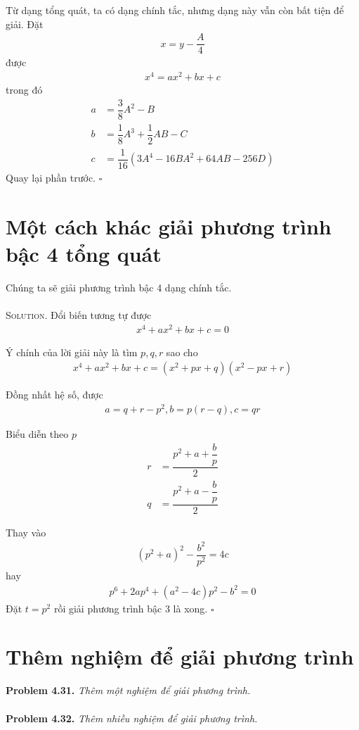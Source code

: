 \documentclass[a4paper,oneside]{book}
\numberwithin{equation}{chapter}
\begin{document}
Từ dạng tổng quát, ta có dạng chính tắc, nhưng dạng này vẫn còn bất tiện để giải. Đặt 
\begin{align}
x = y - \dfrac{A}{4}
\end{align}
được
\begin{align}
{x^4} = a{x^2} + bx + c
\end{align}
trong đó
\begin{align}
a &= \dfrac{3}{8}{A^2} - B\\
b &= \dfrac{1}{8}{A^3} + \dfrac{1}{2}AB - C\\
c &= \dfrac{1}{{16}}\left( {3{A^4} - 16B{A^2} + 64AB - 256D} \right)
\end{align}
Quay lại phần trước. \hfill $\square$
\section{Một cách khác giải phương trình bậc 4 tổng quát}
Chúng ta sẽ giải phương trình bậc 4 dạng chính tắc.\\
\\
\textsc{Solution.} Đổi biến tương tự được
\begin{align}
{x^4} + a{x^2} + bx + c = 0
\end{align}

Ý chính của lời giải này là tìm $p,q,r$ sao cho
\begin{align}
{x^4} + a{x^2} + bx + c = \left( {{x^2} + px + q} \right)\left( {{x^2} - px + r} \right)
\end{align}

Đồng nhất hệ số, được \begin{align}
a = q + r - {p^2},b = p\left( {r - q} \right),c = qr
\end{align}

Biểu diễn theo $p$
\begin{align}
r &= \dfrac{{{p^2} + a + \dfrac{b}{p}}}{2}\\
q &= \dfrac{{{p^2} + a - \dfrac{b}{p}}}{2}
\end{align}

Thay vào
\begin{align}
{\left( {{p^2} + a} \right)^2} - \dfrac{{{b^2}}}{{{p^2}}} = 4c
\end{align}
hay
\begin{align}
{p^6} + 2a{p^4} + \left( {{a^2} - 4c} \right){p^2} - {b^2} = 0
\end{align}
Đặt $t = {p^2}$ rồi giải phương trình bậc 3 là xong. \hfill $\square$
\section{Thêm nghiệm để giải phương trình}
\textbf{Problem 4.31.} \textit{Thêm một nghiệm để giải phương trình.}\\
\\
\textbf{Problem 4.32.} \textit{Thêm nhiều nghiệm để giải phương trình.}
\end{document}
